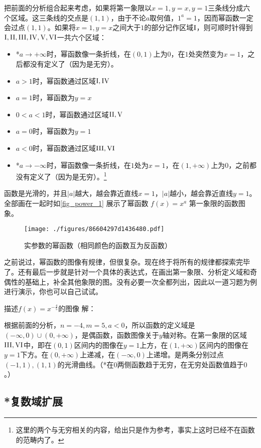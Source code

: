 把前面的分析组合起来考虑，如果将第一象限以$x=1,y=x,y=1$三条线分成六个区域。这三条线的交点是$(1,1)$，由于不论$a$取何值，$1^a=1$，因而幂函数一定会过点$(1,1)$。如果将$x=1,y=x$之间大于$1$的部分记作区域$\rm{I}$，则可顺时针得到$\rm{I, II, III, IV, V, VI}$一共六个区域：
\begin{itemize}
\item *$a\to+\infty$时，幂函数像一条折线，在$(0,1)$上为$0$，在$1$处突然变为$x=1$，之后都没有定义了（因为是无穷）。
\item $a>1$时，幂函数通过区域$\rm{I,IV}$
\item $a=1$时，幂函数为$y=x$
\item $0<a<1$时，幂函数通过区域$\rm{II,V}$
\item $a=0$时，幂函数为$y=1$
\item $a<0$时，幂函数通过区域$\rm{III,VI}$
\item *$a\to-\infty$时，幂函数像一条折线，在$1$处为$x=1$，在$(1,+\infty)$上为$0$，之前都没有定义了（因为是无穷）。\footnote{这里的两个与无穷相关的内容，给出只是作为参考，事实上这时已经不在函数的范畴内了。}
\end{itemize}
函数是光滑的，并且$|a|$越大，越会靠近直线$x=1$，$|a|$越小，越会靠近直线$y=1$。全部画在一起时如\autoref{fig_power_1} 展示了幂函数 $f(x) = x^a$ 第一象限的函数图象。

\begin{figure}[ht]
\centering
\texttt{[image: ./figures/86604297d1436480.pdf]}
\caption{实参数的幂函数（相同颜色的函数互为反函数）}\label{fig_power_1}
\end{figure}

之前说过，幂函数的图像有规律，但很复杂。现在终于将所有的规律都探索完毕了。还有最后一步就是针对一个具体的表达式，在画出第一象限、分析定义域和奇偶性的基础上，补全其他象限的图。没有必要一次全都列出，因此以一道习题为例进行演示，你也可以自己试试。

\begin{exercise}{描述$f(x)=x^{-\frac{4}{5}}$的图像}
解：

根据前面的分析，$n=-4,m=5,a<0$，所以函数的定义域是$({-\infty},0)\cup(0,{+\infty})$，是偶函数，函数图像关于$y$轴对称。在第一象限的区域$\rm{III,VI}$中，即在$(0,1)$区间内的图像在$y=1$上方，在$(1,+\infty)$区间内的图像在$y=1$下方。在$(0,{+\infty})$上递减，在$({-\infty},0)$上递增。是两条分别过点$(-1,1),(1,1)$的光滑曲线。（*在$0$两侧函数趋于无穷，在无穷处函数值趋于$0$。）
\end{exercise}

\subsection{*复数域扩展}

